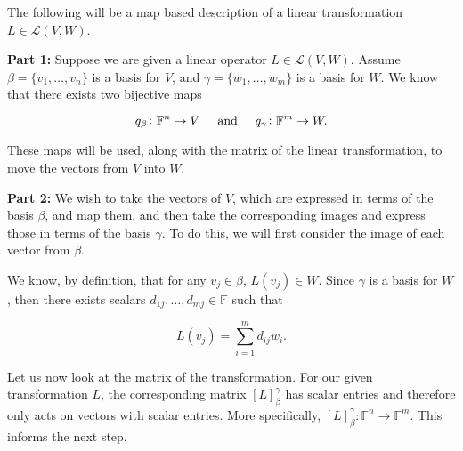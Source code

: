 \documentclass[12pt, a4paper]{article}
\begin{document}
 \hline
 \vspace{4mm}
 
 \centerline{}
 
 \vspace{4mm}
 
 \hline
 
 \vspace{4mm}
 
 \noindent The following will be a map based description of a linear transformation $L\in\mathcal{L}(V,W)$.
 
 \vspace{4mm}
 
 \noindent\textbf{Part 1:} Suppose we are given a linear operator $L\in\mathcal{L}(V,W)$. Assume $\beta=\{v_1,\dots,v_n\}$ is a basis for $V$, and $\gamma=\{w_1,\dots,w_m\}$ is a basis for $W$. We know that there exists two bijective maps
 
 \begin{equation}
     q_{\beta}\colon\mathbb{F}^n\rightarrow V\text{\hspace{5mm}and\hspace{5mm}}q_{\gamma}\colon\mathbb{F}^m\rightarrow W.
 \end{equation}
 
 \vspace{2mm}
 
 \noindent These maps will be used, along with the matrix of the linear transformation, to move the vectors from $V$ into $W$.
 
 \vspace{4mm}
 
 \noindent\textbf{Part 2:} We wish to take the vectors of $V$, which are expressed in terms of the basis $\beta$, and map them, and then take the corresponding images and express those in terms of the basis $\gamma$. To do this, we will first consider the image of each vector from $\beta$.\par
 We know, by definition, that for any $v_j\in\beta$, $L(v_j)\in W$. Since $\gamma$ is a basis for $W$, then there exists scalars $d_{1j},\dots,d_{mj}\in\mathbb{F}$ such that
 
 \begin{equation}
     L(v_j)=\sum\limits_{i=1}^md_{ij}w_i.
 \end{equation}
 
 \vspace{2mm}
 
 \noindent Let us now look at the matrix of the transformation. For our given transformation $L$, the corresponding matrix $[L]_{\beta}^{\gamma}$ has scalar entries and therefore only acts on vectors with scalar entries. More specifically, $[L]_{\beta}^{\gamma}\colon\mathbb{F}^n\rightarrow\mathbb{F}^m$. This informs the next step.
 
\end{document}
